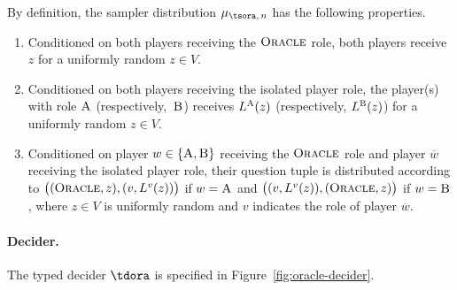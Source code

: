 \documentclass[11pt]{article}
\theoremstyle{definition}
\newcommand{\labelstyle}[1]{\ensuremath{\textsc{#1}}\xspace}
\newcommand{\alice}{\labelstyle{A}}
\newcommand{\bob}{\labelstyle{B}}
\newcommand{\oracle}{\labelstyle{Oracle}}
\begin{document}
By definition, the sampler distribution $\mu_{\tsora,\, n}$ has the
following properties.
\begin{enumerate}
\item Conditioned on both players receiving the $\oracle$ role, both players
  receive $z$ for a uniformly random $z \in V$.
		
\item Conditioned on both players receiving the isolated player role, the
  player(s) with role $\alice$ (respectively,~$\bob$) receives $L^\alice(z)$
  (respectively, $L^\bob(z)$) for a uniformly random $z \in V$.
		
\item Conditioned on player $w\in\{\alice,\bob\}$ receiving the $\oracle$ role
  and player $\overline{w}$ receiving the isolated player role, their question
  tuple is distributed according to $\bigl( (\oracle,z), (v,L^v(z)) \bigr)$ if
  $w=\alice$ and $\bigl( (v, L^v(z)), (\oracle,z) \bigr)$ if $w=\bob$, where $z
  \in V$ is uniformly random and $v$ indicates the role of player
  $\overline{w}$.
\end{enumerate}

\paragraph{Decider.}
The typed decider $\tdora$ is specified in Figure~\ref{fig:oracle-decider}.
\end{document}
